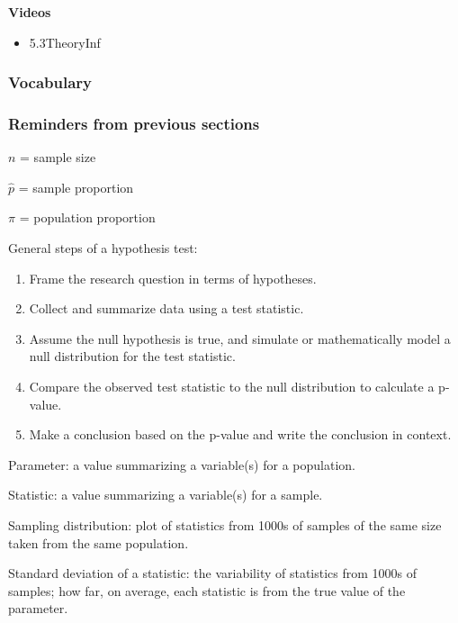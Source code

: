 \documentclass[
]{report}
\providecommand{\tightlist}{%
  \setlength{\itemsep}{0pt}\setlength{\parskip}{0pt}}
\begin{document}
\textbf{Videos}

\begin{itemize}
\tightlist
\item
  5.3TheoryInf
\end{itemize}


\hypertarget{vocabulary-13}{%
\subsubsection*{Vocabulary}\label{vocabulary-13}}

\hypertarget{reminders-from-previous-sections-1}{%
\subsubsection*{Reminders from previous sections}\label{reminders-from-previous-sections-1}}

\(n\) = sample size

\(\hat{p}\) = sample proportion

\(\pi\) = population proportion

General steps of a hypothesis test:

\begin{enumerate}
\def\labelenumi{\arabic{enumi}.}
\item
  Frame the research question in terms of hypotheses.
\item
  Collect and summarize data using a test statistic.
\item
  Assume the null hypothesis is true, and simulate or mathematically model a null distribution for the test statistic.
\item
  Compare the observed test statistic to the null distribution to calculate a p-value.
\item
  Make a conclusion based on the p-value and write the conclusion in context.
\end{enumerate}

Parameter: a value summarizing a variable(s) for a population.

Statistic: a value summarizing a variable(s) for a sample.

Sampling distribution: plot of statistics from 1000s of samples of the same size taken from the same population.

Standard deviation of a statistic: the variability of statistics from 1000s of samples; how far, on average, each statistic is from the true value of the parameter.
\end{document}
